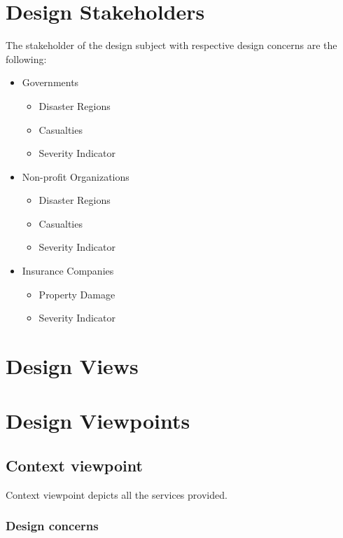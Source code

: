 \documentclass[12pt]{article}
\begin{document}
\section{Design Stakeholders}
    The stakeholder of the design subject with respective design concerns are the following:
    \begin{itemize}
        \item Governments
        \begin{itemize}
            \item Disaster Regions %
            \item Casualties
            \item Severity Indicator
        \end{itemize}
        
        \item Non-profit Organizations
        \begin{itemize}
            \item Disaster Regions %
            \item Casualties
            \item Severity Indicator
        \end{itemize}
        
        \item Insurance Companies
        \begin{itemize}
            \item Property Damage
            \item Severity Indicator
        \end{itemize}
        
    \end{itemize}
\section{Design Views}
\section{Design Viewpoints}
        \subsection{Context viewpoint}%
            Context viewpoint depicts all the services provided.
            \subsubsection{Design concerns}
\end{document}
